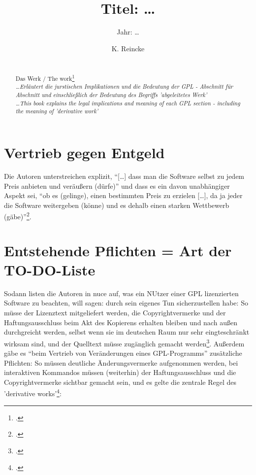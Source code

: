 \documentclass[DIV=calc,BCOR=5mm,11pt,headings=small,oneside,abstract=true, toc=bib]{scrartcl}
\begin{document}

\titlehead{Literaturexzerpt}
\subject{Autor(en): \ldots}
\title{Titel: \ldots}
\subtitle{Jahr: \ldots }
\author{K. Reincke}

\maketitle

\begin{abstract}
\noindent

\cite[(ist:)][]{ifross2005a} \\
Das Werk / The work\footcite[cf.][]{ifross2005a} \\
\noindent \itshape
\ldots Erläutert die jurstischen Implikationen und die Bedeutung der GPL -
Abschnitt für Abschnitt und einschließlich der Bedeutung des Begriffs
'abgeleitetes Werk' \\
\noindent
\ldots This book explains the legal implications and meaning of each GPL section
- including the meaning of 'derivative work'
\end{abstract}
\footnotesize
\normalsize

\section{Vertrieb gegen Entgeld}

Die Autoren unterstreichen explizit, \enquote{[\ldots] dass man die Software
selbst zu jedem Preis anbieten und veräußern (dürfe)} und dass es ein
davon unabhängiger Aspekt sei, \enquote{ob es (gelinge), einen bestimmten Preis
zu erzielen [\ldots], da ja jeder die Software weitergeben (könne) und es dehalb
einen starken Wettbewerb (gäbe)}\footcite[cf.][15]{ifross2005a}.

\section{Entstehende Pflichten =  Art der TO-DO-Liste}

Sodann listen die Autoren in nuce auf, was ein NUtzer einer GPL lizenzierten
Software zu beachten, will sagen: durch sein eigenes Tun sicherzustellen habe:
So müsse der Lizenztext mitgeliefert werden, die Copyrightvermerke und der
Haftungsausschluss beim Akt des Kopierens erhalten bleiben und nach außen
durchgreicht werden, selbst wenn sie im deutschen Raum nur sehr eingteschränkt
wirksam sind, und der Quelltext müsse zugänglich gemacht
werden\footcite[cf.][16]{ifross2005a}. Außerdem gäbe es \enquote{beim Vertrieb
von Veränderungen eines GPL-Programms} zusätzliche Pflichten: So müssen
deutliche Änderungsvermerke aufgenommen werden, bei interaktiven Kommandos
müssen (weiterhin) der Haftungsausschluss und die Copyrightvermerke sichtbar
gemacht sein, und es gelte die zentrale Regel des 'derivative
works'\footcite[cf.][17]{ifross2005a}:
\end{document}
